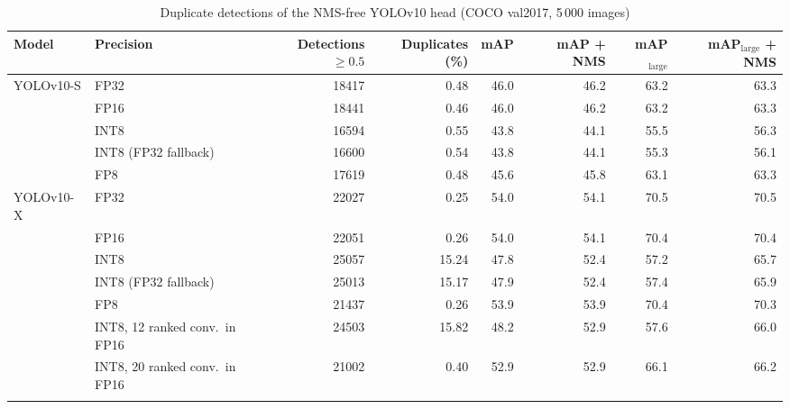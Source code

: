 \documentclass[pdflatex,sn-mathphys-num]{sn-jnl}%
\theoremstyle{thmstyleone}%
\theoremstyle{thmstyletwo}%
\theoremstyle{thmstylethree}%
\begin{document}
\begin{appendices}
\begin{table}
\footnotesize\setlength{\tabcolsep}{4pt}
\caption{Duplicate detections of the NMS-free YOLOv10 head (COCO val2017, 5\,000 images)}\label{tab:duplicates}
\begin{tabular}{@{}llrrrrrr@{}}
\toprule
Model & Precision & Detections $\geq0.5$ & Duplicates (\%) & mAP & mAP + NMS & mAP$_\text{large}$ & mAP$_\text{large}$ + NMS \\
\midrule
YOLOv10-S & FP32 & 18417 & 0.48 & 46.0 & 46.2 & 63.2 & 63.3 \\
 & FP16 & 18441 & 0.46 & 46.0 & 46.2 & 63.2 & 63.3 \\
 & INT8 & 16594 & 0.55 & 43.8 & 44.1 & 55.5 & 56.3 \\
 & INT8 (FP32 fallback) & 16600 & 0.54 & 43.8 & 44.1 & 55.3 & 56.1 \\
 & FP8 & 17619 & 0.48 & 45.6 & 45.8 & 63.1 & 63.3 \\
\midrule
YOLOv10-X & FP32 & 22027 & 0.25 & 54.0 & 54.1 & 70.5 & 70.5 \\
 & FP16 & 22051 & 0.26 & 54.0 & 54.1 & 70.4 & 70.4 \\
 & INT8 & 25057 & 15.24 & 47.8 & 52.4 & 57.2 & 65.7 \\
 & INT8 (FP32 fallback) & 25013 & 15.17 & 47.9 & 52.4 & 57.4 & 65.9 \\
 & FP8 & 21437 & 0.26 & 53.9 & 53.9 & 70.4 & 70.3 \\
 & INT8, 12 ranked conv.\ in FP16 & 24503 & 15.82 & 48.2 & 52.9 & 57.6 & 66.0 \\
 & INT8, 20 ranked conv.\ in FP16 & 21002 & 0.40 & 52.9 & 52.9 & 66.1 & 66.2 \\
\botrule
\end{tabular}
\end{table}


\end{appendices}
\end{document}
